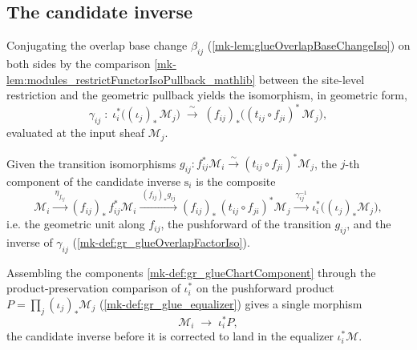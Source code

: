 \subsection{The candidate inverse}

\begin{definition}\label{mk-def:gr_glueOverlapFactorIso}
  \leanok

  Conjugating the overlap base change \(\beta_{ij}\)
  (\ref{mk-lem:glueOverlapBaseChangeIso}) on both sides by the comparison
  \ref{mk-lem:modules_restrictFunctorIsoPullback_mathlib} between the site-level
  restriction and the geometric pullback yields the isomorphism, in geometric form,
  \[
    \gamma_{ij} \;:\;
      \iota_i^{*}\bigl((\iota_j)_{*}\,\mathcal{M}_j\bigr)
        \;\xrightarrow{\ \sim\ }\;
      (f_{ij})_{*}\bigl((t_{ij}\circ f_{ji})^{*}\,\mathcal{M}_j\bigr),
  \]
  evaluated at the input sheaf \(\mathcal{M}_j\).
\end{definition}

\begin{definition}\label{mk-def:gr_glueChartComponent}
  \leanok

  Given the transition isomorphisms \(g_{ij} : f_{ij}^{*}\mathcal{M}_i \xrightarrow{\sim}
  (t_{ij}\circ f_{ji})^{*}\mathcal{M}_j\), the \(j\)-th component of the candidate
  inverse \(\mathrm{s}_i\) is the composite
  \[
    \mathcal{M}_i
      \xrightarrow{\ \eta_{f_{ij}}\ }
    (f_{ij})_{*}\,f_{ij}^{*}\mathcal{M}_i
      \xrightarrow{\ (f_{ij})_{*}g_{ij}\ }
    (f_{ij})_{*}\,(t_{ij}\circ f_{ji})^{*}\mathcal{M}_j
      \xrightarrow{\ \gamma_{ij}^{-1}\ }
    \iota_i^{*}\bigl((\iota_j)_{*}\mathcal{M}_j\bigr),
  \]
  i.e. the geometric unit along \(f_{ij}\), the pushforward of the transition
  \(g_{ij}\), and the inverse of \(\gamma_{ij}\) (\ref{mk-def:gr_glueOverlapFactorIso}).
\end{definition}

\begin{definition}\label{mk-def:gr_glueChartFamily}
  \leanok

  Assembling the components \ref{mk-def:gr_glueChartComponent} through the
  product-preservation comparison of \(\iota_i^{*}\) on the pushforward product
  \(P = \prod_j (\iota_j)_{*}\mathcal{M}_j\) (\ref{mk-def:gr_glue_equalizer}) gives a
  single morphism
  \[
    \mathcal{M}_i \;\longrightarrow\; \iota_i^{*}P,
  \]
  the candidate inverse before it is corrected to land in the equalizer
  \(\iota_i^{*}\mathcal{M}\).
\end{definition}

